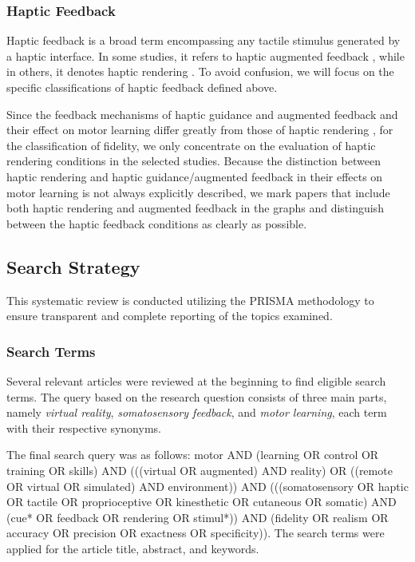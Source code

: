 \subsubsection{Haptic Feedback}
Haptic feedback is a broad term encompassing any tactile stimulus generated by a haptic interface. In some studies, it refers to haptic augmented feedback \cite{Gambaro2014}, while in others, it denotes haptic rendering \cite{Caccianiga2021}. To avoid confusion, we will focus on the specific classifications of haptic feedback defined above.

\newline

Since the feedback mechanisms of haptic guidance and augmented feedback and their effect on motor learning differ greatly from those of haptic rendering \cite{Sigrist2013AugmentedReview}, for the classification of fidelity, we only concentrate on the evaluation of haptic rendering conditions in the selected studies. Because the distinction between haptic rendering and haptic guidance/augmented feedback in their effects on motor learning is not always explicitly described, we mark papers that include both haptic rendering and augmented feedback in the graphs and distinguish between the haptic feedback conditions as clearly as possible.

\subsection{Search Strategy}

This systematic review is conducted utilizing the PRISMA methodology \cite{Page2021TheReviews} to ensure transparent and complete reporting of the topics examined.

\subsubsection{Search Terms}
Several relevant articles were reviewed at the beginning to find eligible search terms. The query based on the research question consists of three main parts, namely \textit{virtual reality}, \textit{somatosensory feedback}, and \textit{motor learning}, each term with their respective synonyms. 

The final search query was as follows: motor AND (learning OR control OR training OR skills) AND (((virtual OR augmented) AND reality) OR ((remote OR virtual OR simulated) AND environment)) AND (((somatosensory OR haptic OR tactile OR proprioceptive OR kinesthetic OR cutaneous OR somatic) AND 
(cue* OR feedback OR rendering OR stimul*)) AND (fidelity OR realism OR accuracy OR precision OR exactness OR specificity)). The search terms were applied for the article title, abstract, and keywords.

